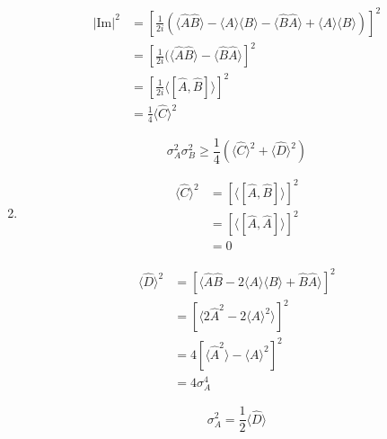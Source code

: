 \documentclass[12pt]{article}
\begin{document}
\begin{enumerate}
          \begin{equation*}
              \begin{split}
                  {|\text{Im}|}^2
                   & = \left[ \frac{1}{2i} (\langle \hat{A} \hat{B} \rangle - \langle A \rangle \langle B \rangle - \langle \hat{B} \hat{A} \rangle + \langle A \rangle \langle B \rangle) \right]^2 \\
                   & = \left[ \frac{1}{2i} (\langle \hat{A} \hat{B} \rangle - \langle \hat{B} \hat{A} \rangle \right]^2                                                                              \\
                   & =  \left[ \frac{1}{2i} \langle [\hat{A}, \hat{B}] \rangle \right]^2                                                                                                             \\
                   & = \frac{1}{4} \langle \hat{C} \rangle^2
              \end{split}
          \end{equation*}

          \[
              \sigma_A^2 \sigma_B^2 \geq \frac{1}{4} (\langle \hat{C} \rangle^2 + \langle \hat{D} \rangle^2)
          \]

    \item

          \begin{equation*}
              \begin{split}
                  \langle\hat{C}\rangle^2
                   & = \left[\langle [\hat{A}, \hat{B}] \rangle \right]^2 \\
                   & = \left[\langle [\hat{A}, \hat{A}] \rangle \right]^2 \\
                   & = 0
              \end{split}
          \end{equation*}

          \begin{equation*}
              \begin{split}
                  \langle\hat{D}\rangle^2
                   & = \left[\langle \hat{A} \hat{B} - 2\langle A \rangle \langle B \rangle + \hat{B} \hat{A} \rangle \right]^2 \\
                   & = \left[\langle 2\hat{A}^2 - 2{\langle A \rangle}^2 \rangle \right]^2                                      \\
                   & = 4\left[\langle\hat{A}^2\rangle - {\langle A \rangle}^2 \right]^2                                         \\
                   & = 4 \sigma^4_A
              \end{split}
          \end{equation*}

          \[
              \sigma_A^2 =  \frac{1}{2}\langle\hat{D}\rangle
          \]
\end{enumerate}
\newpage
\end{document}
